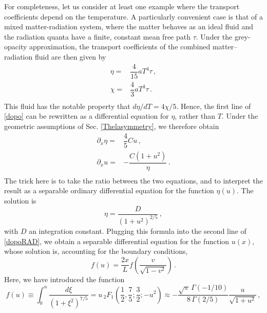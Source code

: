 \documentclass[a4paper, amsfonts, amssymb, amsmath, reprint, showkeys, nofootinbib, twoside,notitlepage,onecolumn]{revtex4-1}
\theoremstyle{definition}
\theoremstyle{theorem}
\begin{document}
For completeness, let us consider at least one example where the transport coefficients depend on the temperature. A particularly convenient case is that of a mixed matter-radiation system, where the matter behaves as an ideal fluid and the radiation quanta have a finite, constant mean free path $\tau$. Under the grey-opacity approximation, the transport coefficients of the combined matter–radiation fluid are then given by \cite{Weinberg1971,UdeyIsrael1982,GavassinoRadHydroDisp2024cqw}
\begin{equation}
\begin{split}
\eta={}& \dfrac{4}{15} aT^4 \tau \, , \\
\chi={}& \dfrac{4}{3} aT^3 \tau \, . \\
\end{split}
\end{equation}
This fluid has the notable property that $d\eta/dT=4\chi/5$. Hence, the first line of \eqref{dopo} can be rewritten as a differential equation for $\eta$, rather than $T$. Under the geometric assumptions of Sec. \ref{Thelasymmetry}, we therefore obtain
\begin{equation}\label{dopoRAD}
\begin{split}
\partial_x \eta={}& \dfrac{4}{5} Cu \, ,\\
\partial_x u={}& -\dfrac{C(1{+}u^2)}{\eta} \, .\\
\end{split}
\end{equation}
The trick here is to take the ratio between the two equations, and to interpret the result as a separable ordinary differential equation for the function $\eta(u)$. The solution is
\begin{equation}
\eta=\dfrac{D}{(1{+}u^2)^{2/5}} \, ,
\end{equation}
with $D$ an integration constant. Plugging this formula into the second line of \eqref{dopoRAD}, we obtain a separable differential equation for the function $u(x)$, whose solution is, accounting for the boundary conditions,
\begin{equation}
f(u)=\dfrac{2x}{L} f\left(\dfrac{v}{\sqrt{1{-}v^2}} \right)\, .
\end{equation}
Here, we have introduced the function
\begin{equation}
f(u)\equiv \int_0^u \dfrac{d\xi}{(1+\xi^2)^{7/5}}=u \, _2 F_1 \left(\dfrac{1}{2},\dfrac{7}{5};\dfrac{3}{2};-u^2 \right) \approx -\dfrac{\sqrt{\pi}\, \Gamma(-1/10)}{8\,\Gamma(2/5)} \dfrac{u}{\sqrt{1+u^2}}\, ,
\end{equation}
\end{document}

